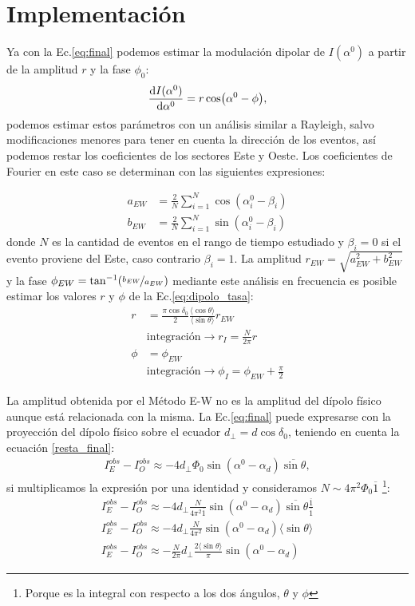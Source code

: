     \section*{Implementación}

Ya con la Ec.\ref{eq:final} podemos estimar la modulación dipolar de $I(\alpha^0)$ a partir de la amplitud $r$ y la fase $\phi_0$:
\begin{equation}
    \dv{I(\alpha^0)}{\alpha^0} = r \cos(\alpha^0 - \phi),
    \label{eq:dipolo_tasa}
\end{equation}
podemos estimar estos parámetros con un análisis similar a  Rayleigh, salvo modificaciones menores para tener en cuenta la dirección de los eventos, así podemos restar los coeficientes de los sectores Este y Oeste. Los coeficientes de Fourier en este caso se determinan con las siguientes expresiones:

\begin{align*}
    a_{EW} &= \frac{2}{N} \sum^N_{i=1} \cos(\alpha^0_i - \beta_i)\\
    b_{EW} &= \frac{2}{N} \sum^N_{i=1} \sin(\alpha^0_i - \beta_i)
\end{align*}
donde $N$ es la cantidad de eventos en el rango de tiempo estudiado y $\beta_i=0$ si el evento proviene del Este, caso contrario $\beta_i=1$. La amplitud  $r_{EW} = \sqrt{a_{EW}^2 + b_{EW}^2}$ y la fase $\phi_{EW} = \tan^{-1}(\nicefrac{b_{EW}}{a_{EW}})$ mediante este análisis en frecuencia es posible estimar los valores $r$ y $\phi$ de la Ec.\ref{eq:dipolo_tasa}:
\begin{align*}
    r &= \frac{\pi \cos\delta_0}{2} \frac{\langle\cos\theta \rangle}{\langle\sin\theta \rangle} r_{EW} \\ 
    &\text{integración} \rightarrow r_I =\frac{N}{2\pi}r \\
    \phi &= \phi_{EW} \\
    &\text{integración} \rightarrow \phi_I = \phi_{EW} + \frac{\pi}{2}
\end{align*}


La amplitud obtenida por el Método E-W no es la amplitud del dípolo físico aunque está relacionada con la misma. La Ec.\ref{eq:final} puede expresarse con la proyección del dípolo físico sobre el ecuador $d_{\perp}= d\cos\delta_0$, teniendo en cuenta la ecuación  \ref{resta_final}:
\begin{align}
    I^{obs}_E -  I^{obs}_O \approx -4 d_\perp \Phi_0 \sin(\alpha^0  - \alpha_d)\overline{\sin\theta},
\end{align}
si multiplicamos la expresión por una identidad y consideramos $N \sim 4\pi^2 \Phi_0 \overline{1} $ \footnote{Porque es la integral con respecto a los dos ángulos, $\theta$ y $\phi$}:
\begin{align}
    I^{obs}_E -  I^{obs}_O \approx -4 d_\perp \frac{N}{ 4\pi^2\overline{1}} \sin(\alpha^0  - \alpha_d)\overline{\sin\theta} \frac{\overline{1}}{\overline{1}}\\
    I^{obs}_E -  I^{obs}_O \approx -4 d_\perp \frac{N}{ 4\pi^2} \sin(\alpha^0  - \alpha_d)\langle\sin\theta \rangle\\
    I^{obs}_E -  I^{obs}_O \approx -\frac{N}{2\pi} d_\perp \frac{2\langle\sin\theta \rangle }{\pi}\sin(\alpha^0  - \alpha_d)
\end{align}

